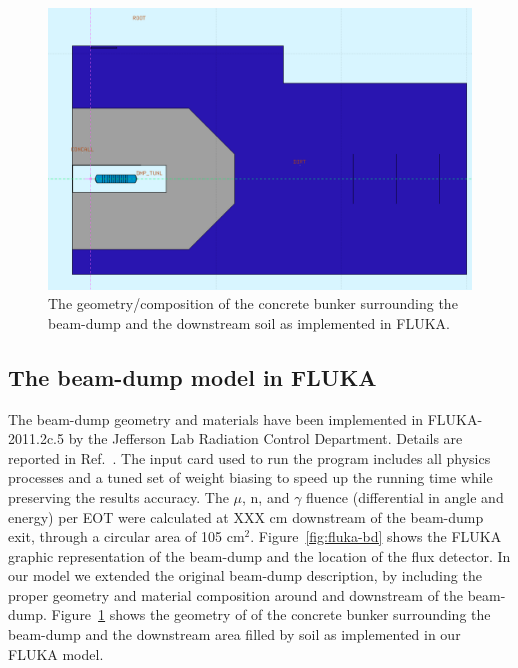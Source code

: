\begin{figure}[h!] 
\center
\includegraphics[width=12.5cm]{figs/fluka-bd-dwns.pdf}
\caption{The geometry/composition  of the concrete bunker surrounding the beam-dump and  the downstream soil as implemented in FLUKA.}
\label{fig:fluka-bd-dwns}
\end{figure}
\subsection{The beam-dump model in FLUKA}
The beam-dump geometry and  materials have  been implemented in FLUKA-2011.2c.5 by the Jefferson Lab Radiation Control Department. Details are reported in Ref.~\cite{jnote-bd}.  The input card used to run the program  includes all physics processes and a tuned set of weight biasing to speed up the running time while preserving the  results accuracy. 
The $\mu$, n, and $\gamma$ fluence (differential in angle and energy) per EOT were  calculated   at XXX cm  downstream of the beam-dump exit, through a circular area of 105 cm$^2$. Figure~\ref{fig:fluka-bd} shows the FLUKA graphic representation of the beam-dump and the location of the flux detector.
In our model we extended the original beam-dump description, by including  
 the proper geometry and material composition around and downstream of the beam-dump.
Figure~\ref{fig:fluka-bd-dwns}  shows the geometry of of the concrete bunker surrounding the beam-dump and  the downstream area filled by soil as implemented in our FLUKA model.



